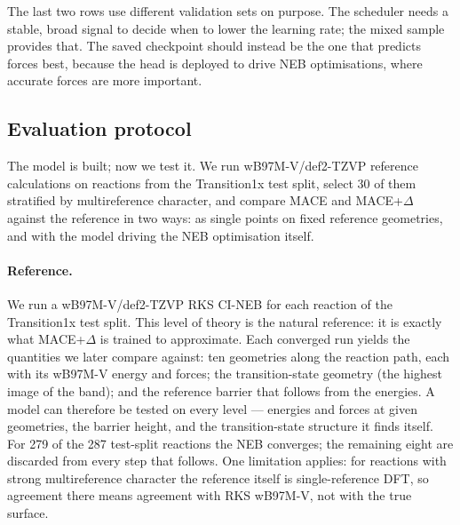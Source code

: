 The last two rows use different validation sets on purpose. The scheduler
needs a stable, broad signal to decide when to lower the learning rate; the
mixed sample provides that. The saved checkpoint should instead be the one
that predicts forces best, because the head is deployed to drive NEB
optimisations, where accurate forces are more important.


\subsection{Evaluation protocol}
\label{sec:delta-protocol}

The model is built; now we test it. We run wB97M-V/def2-TZVP reference
calculations on reactions from the Transition1x test split, select 30 of
them stratified by multireference character, and compare MACE and
MACE+$\Delta$ against the reference in two ways: as single points on fixed
reference geometries, and with the model driving the NEB optimisation
itself.

\paragraph{Reference.}
We run a wB97M-V/def2-TZVP RKS CI-NEB for each reaction of the Transition1x
test split. This level of theory is the natural reference: it is exactly
what MACE+$\Delta$ is trained to approximate. Each converged run yields the
quantities we later compare against: ten geometries along the reaction path,
each with its wB97M-V energy and forces; the transition-state geometry (the
highest image of the band); and the reference barrier that follows from the
energies. A model can therefore be tested on every level --- energies and
forces at given geometries, the barrier height, and the transition-state
structure it finds itself. For 279 of the 287 test-split reactions the NEB
converges; the remaining eight are discarded from every step that follows.
One limitation applies: for reactions with strong multireference character
the reference itself is single-reference DFT, so agreement there means
agreement with RKS wB97M-V, not with the true surface.

